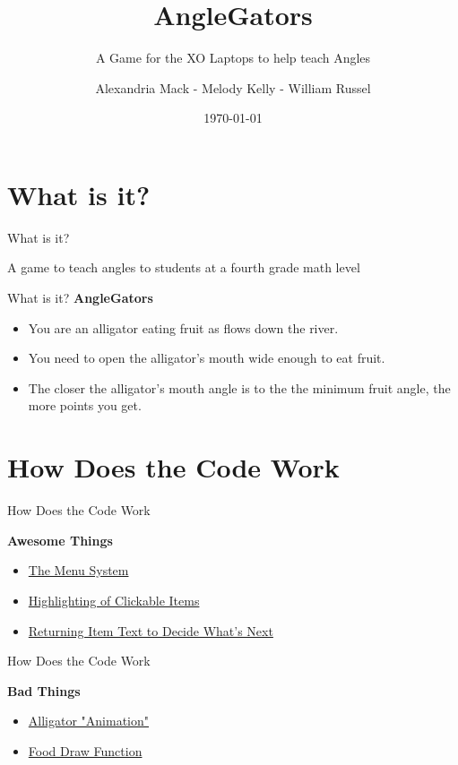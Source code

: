 \documentclass[10pt, compress]{beamer}
\title{AngleGators}
\subtitle{A Game for the XO Laptops to help teach Angles}
\date{\today}
\author{Alexandria Mack - Melody Kelly - William Russel}
\institute{}
\begin{document}
\maketitle

\section{What is it?}

\begin{frame}{What is it?}
\begin{center}A game to teach angles to students at a fourth grade math level\end{center}
\end{frame}
    
    \begin{frame}{What is it?}
    \textbf{AngleGators}
    \begin{itemize}
    \item You are an alligator eating fruit as flows down the river.
    \item You need to open the alligator's mouth wide enough to eat fruit.
    \item The closer the alligator's mouth angle is to the the minimum fruit angle, the more points you get.
    \end{itemize}
    \end{frame}


\section{How Does the Code Work}

\begin{frame}{How Does the Code Work}

\textbf{Awesome Things}
\begin{itemize}
\item \href{https://github.com/amm4108/AngleGators/blob/master/Scene.py}{The Menu System}
\item \href{https://github.com/amm4108/AngleGators/blob/master/Scene.py\#L140}{Highlighting of Clickable Items}
\item \href{https://github.com/amm4108/AngleGators/blob/master/angle_gators.py\#L104}{Returning Item Text to Decide What's Next}
\end{itemize}

\end{frame}

\begin{frame}{How Does the Code Work}

\textbf{Bad Things}
\begin{itemize}
\item \href{https://github.com/amm4108/AngleGators/blob/master/Alligator.py\#L48}{Alligator "Animation"}
\item \href{https://github.com/amm4108/AngleGators/blob/master/Food.py\#L63}{Food Draw Function}
\end{itemize}

\end{frame}
\end{document}
